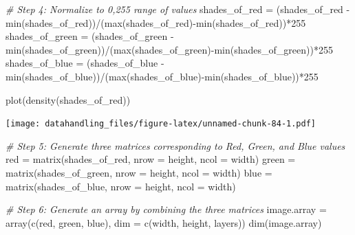 \documentclass[
  12pt,
]{style/krantz}
\newenvironment{Shaded}{\begin{snugshade}}{\end{snugshade}}
\newcommand{\AttributeTok}[1]{\textcolor[rgb]{0.77,0.63,0.00}{#1}}
\newcommand{\CommentTok}[1]{\textcolor[rgb]{0.56,0.35,0.01}{\textit{#1}}}
\newcommand{\DecValTok}[1]{\textcolor[rgb]{0.00,0.00,0.81}{#1}}
\newcommand{\FunctionTok}[1]{\textcolor[rgb]{0.00,0.00,0.00}{#1}}
\newcommand{\NormalTok}[1]{#1}
\newcommand{\OtherTok}[1]{\textcolor[rgb]{0.56,0.35,0.01}{#1}}
\newcommand{\SpecialCharTok}[1]{\textcolor[rgb]{0.00,0.00,0.00}{#1}}
\begin{document}
\begin{Shaded}
\begin{Highlighting}[]
\CommentTok{\# Step 4: Normalize to 0,255 range of values}
\NormalTok{shades\_of\_red }\OtherTok{=}\NormalTok{ (shades\_of\_red }\SpecialCharTok{{-}} \FunctionTok{min}\NormalTok{(shades\_of\_red))}\SpecialCharTok{/}\NormalTok{(}\FunctionTok{max}\NormalTok{(shades\_of\_red)}\SpecialCharTok{{-}}\FunctionTok{min}\NormalTok{(shades\_of\_red))}\SpecialCharTok{*}\DecValTok{255}
\NormalTok{shades\_of\_green }\OtherTok{=}\NormalTok{ (shades\_of\_green }\SpecialCharTok{{-}} \FunctionTok{min}\NormalTok{(shades\_of\_green))}\SpecialCharTok{/}\NormalTok{(}\FunctionTok{max}\NormalTok{(shades\_of\_green)}\SpecialCharTok{{-}}\FunctionTok{min}\NormalTok{(shades\_of\_green))}\SpecialCharTok{*}\DecValTok{255}
\NormalTok{shades\_of\_blue }\OtherTok{=}\NormalTok{ (shades\_of\_blue }\SpecialCharTok{{-}} \FunctionTok{min}\NormalTok{(shades\_of\_blue))}\SpecialCharTok{/}\NormalTok{(}\FunctionTok{max}\NormalTok{(shades\_of\_blue)}\SpecialCharTok{{-}}\FunctionTok{min}\NormalTok{(shades\_of\_blue))}\SpecialCharTok{*}\DecValTok{255}

\FunctionTok{plot}\NormalTok{(}\FunctionTok{density}\NormalTok{(shades\_of\_red))}
\end{Highlighting}
\end{Shaded}

\texttt{[image: datahandling\_files/figure-latex/unnamed-chunk-84-1.pdf]}

\begin{Shaded}
\begin{Highlighting}[]
\CommentTok{\# Step 5: Generate three matrices corresponding to Red, Green, and Blue values}
\NormalTok{red }\OtherTok{=} \FunctionTok{matrix}\NormalTok{(shades\_of\_red, }\AttributeTok{nrow =}\NormalTok{ height, }\AttributeTok{ncol =}\NormalTok{ width)}
\NormalTok{green }\OtherTok{=} \FunctionTok{matrix}\NormalTok{(shades\_of\_green, }\AttributeTok{nrow =}\NormalTok{ height, }\AttributeTok{ncol =}\NormalTok{ width)}
\NormalTok{blue }\OtherTok{=} \FunctionTok{matrix}\NormalTok{(shades\_of\_blue, }\AttributeTok{nrow =}\NormalTok{ height, }\AttributeTok{ncol =}\NormalTok{ width)}

\CommentTok{\# Step 6: Generate an array by combining the three matrices}
\NormalTok{image.array }\OtherTok{=} \FunctionTok{array}\NormalTok{(}\FunctionTok{c}\NormalTok{(red, green, blue), }\AttributeTok{dim =} \FunctionTok{c}\NormalTok{(width, height, layers))}
\FunctionTok{dim}\NormalTok{(image.array)}
\end{Highlighting}
\end{Shaded}
\end{document}
